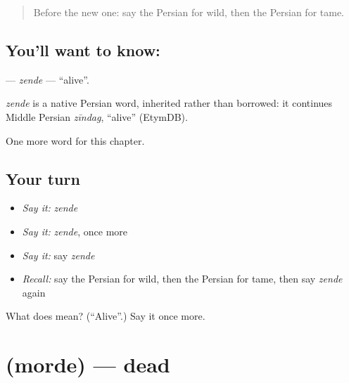 \label{lesson:FA-C237-zende}



\begin{quote}
Before the new one: say the Persian for wild, then the Persian for tame.
\end{quote}

\subsection*{You'll want to know: }
\textbf{} — \emph{zende} — \textquotedblleft{}alive\textquotedblright{}.

\begin{cousinweb}
\emph{zende} is a native Persian word, inherited rather than borrowed: it continues Middle Persian \emph{zīndag}, \textquotedblleft{}alive\textquotedblright{} (EtymDB).
\end{cousinweb}

\begin{grammarlens}[title={What you've built}]
One more word for this chapter.
\end{grammarlens}

\subsection*{Your turn}
\begin{itemize}
\raggedright
  \item \emph{Say it:} \emph{zende}
  \item \emph{Say it:} \emph{zende}, once more
  \item \emph{Say it:} say \emph{zende}
  \item \emph{Recall:} say the Persian for wild, then the Persian for tame, then say \emph{zende} again
\end{itemize}

\begin{tcolorbox}[breakable,colback=teal!4,colframe=teal!35!black,title={Before you move on}]
What does  mean? (\textquotedblleft{}Alive\textquotedblright{}.) Say it once more.
\end{tcolorbox}
\section[\texorpdfstring{\fa{مرده} (morde)}{مرده (morde)}]{ (morde) — dead}

\label{lesson:FA-C237-morde}



